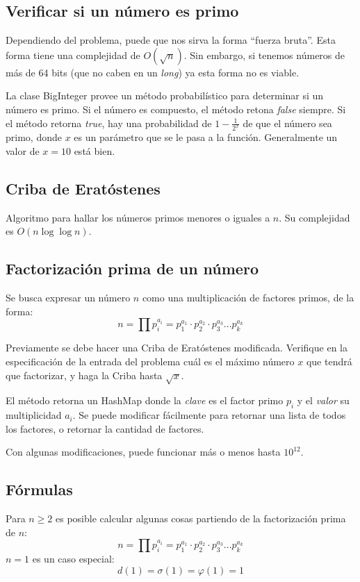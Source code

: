 \documentclass{article}
\begin{document}
\begin{multicols}{2}
	\subsection{Verificar si un número es primo}
	Dependiendo del problema, puede que nos sirva la forma ``fuerza bruta''. Esta forma tiene una complejidad de \( O(\sqrt{n}) \). Sin embargo, si tenemos números de más de 64 bits (que no caben en un \emph{long}) ya esta forma no es viable. 
	
	La clase BigInteger provee un método probabilístico para determinar si un número es primo. Si el número es compuesto, el método retona \emph{false} siempre. Si el método retorna \emph{true}, hay una probabilidad de \( 1-\frac{1}{2^x} \) de que el número sea primo, donde \(x\) es un parámetro que se le pasa a la función. Generalmente un valor de \(x = 10\) está bien.
	

	\subsection{Criba  de Eratóstenes}
	Algoritmo para hallar los números primos menores o iguales a \( n \). Su complejidad es \( O(n \log \log n) \).
	
	
	\subsection{Factorización prima de un número}
	Se busca expresar un número \( n \) como una multiplicación de factores primos, de la forma:
	\[ n = \prod p_{i}^{a_{i}} = p_{1}^{a_{1}} \cdot p_{2}^{a_{2}} \cdot p_{3}^{a_{3}} ...  p_{k}^{a_{k}} \]
	
	Previamente se debe hacer una Criba de Eratóstenes modificada. Verifique en la especificación de la entrada del problema cuál es el máximo número \( x \) que tendrá que factorizar, y haga la Criba hasta \( \sqrt{x} \).
	
	El método retorna un HashMap donde la \emph{clave} es el factor primo \( p_{i} \) y el \emph{valor} su multiplicidad \( a_{i} \). Se puede modificar fácilmente para retornar una lista de todos los factores, o retornar la cantidad de factores.
	
	Con algunas modificaciones, puede funcionar más o menos hasta \( 10^{12} \).
	
	
	\subsection{Fórmulas}
	Para \( n \geq 2 \) es posible calcular algunas cosas partiendo de la factorización prima de \( n \):
	\[ n = \prod p_{i}^{a_{i}} = p_{1}^{a_{1}} \cdot p_{2}^{a_{2}} \cdot p_{3}^{a_{3}} ...  p_{k}^{a_{k}} \]
	\( n = 1 \) es un caso especial:
	\[ d(1) = \sigma (1) = \varphi (1) = 1 \]


\end{multicols}
\end{document}
